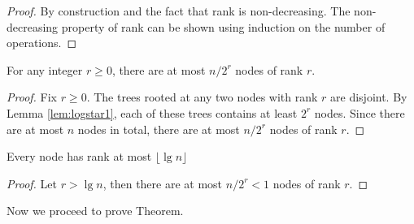 \begin{proof}
    By construction and the fact that rank is non-decreasing. The non-decreasing property of rank can be shown using induction on the number of operations.
\end{proof}

\begin{lemma} \label{lem:logstar3}
    For any integer $r \geq 0$, there are at most $n/2^r$ nodes of rank $r$.
\end{lemma}

\begin{proof}
    Fix $r \geq 0$. The trees rooted at any two nodes with rank $r$ are disjoint. By Lemma \ref{lem:logstar1}, each of these trees contains at least $2^r$ nodes. Since there are at most $n$ nodes in total, there are at most $n/2^r$ nodes of rank $r$.
\end{proof}

\begin{corollary} \label{cor:logstar4}
    Every node has rank at most $\lfloor \lg n \rfloor$ 
\end{corollary}

\begin{proof}
    Let $r > \lg n$, then there are at most $n/2^r < 1$ nodes of rank $r$.
\end{proof}

Now we proceed to prove Theorem.

